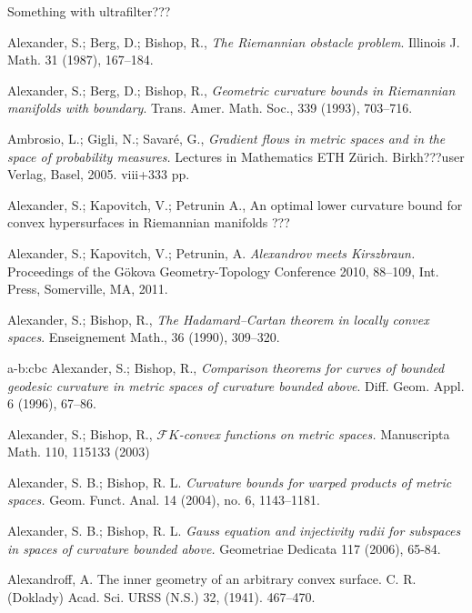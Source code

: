 \begin{thebibliography}{52}


 Something with  ultrafilter???

 Alexander, S.; Berg, D.; Bishop, R., \textit{The Riemannian obstacle problem}.
Illinois J. Math. 31 (1987), 167--184.

 Alexander, S.; Berg, D.; Bishop, R., \textit{ Geometric curvature bounds in Riemannian manifolds with
  boundary}.
  Trans. Amer. Math. Soc., 339 (1993), 703--716.

 Ambrosio, L.; Gigli, N.; Savar\'e, G., \textit{Gradient flows in metric spaces and in the space of probability measures.} Lectures in Mathematics ETH Z\"urich. Birkh???user Verlag, Basel, 2005. viii+333 pp.

 Alexander, S.; Kapovitch, V.; Petrunin A., An optimal lower curvature bound for convex hypersurfaces in Riemannian manifolds ???

Alexander, S.; Kapovitch, V.; Petrunin, A.
\textit{Alexandrov meets Kirszbraun.} Proceedings of the G\"okova Geometry-Topology Conference 2010, 88--109, Int. Press, Somerville, MA, 2011. 

Alexander, S.; Bishop, R., \textit{The Hadamard--Cartan theorem in locally convex spaces}. Enseignement Math., 36 (1990), 309--320.

\bibitem
{a-b:cbc} Alexander, S.; Bishop, R., \textit{Comparison theorems for curves of bounded geodesic curvature
  in metric spaces of curvature bounded above}.
Diff. Geom. Appl. 6 (1996), 67--86.

 Alexander, S.; Bishop, R., \textit{$\mathcal F
K$-convex functions on metric spaces.} Manuscripta Math. 110, 115133 (2003)


 Alexander, S. B.; Bishop, R. L. \textit{Curvature bounds for warped products of metric spaces.}  Geom. Funct. Anal.  14  (2004),  no. 6, 1143--1181.

Alexander, S. B.; Bishop, R. L. \textit{Gauss equation and injectivity radii for subspaces in spaces of curvature bounded above.}  Geometriae Dedicata 117 (2006), 65-84.

 Alexandroff, A.
The inner geometry of an arbitrary convex surface.
C. R. (Doklady) Acad. Sci. URSS (N.S.) 32, (1941). 467--470. 


\end{thebibliography}

